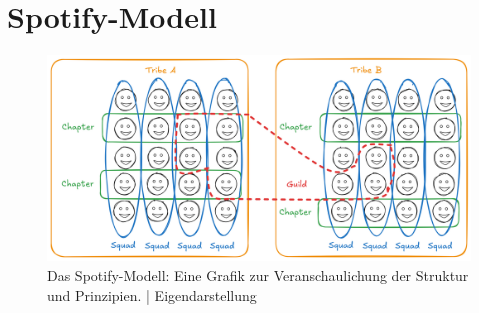 \cleardoublepage
\section{Spotify-Modell}
\label{sec:Spoitfy}

\begin{figure}[H]
    \centering %
    \includegraphics[width=\textwidth]{images/spot} %
    \caption{Das Spotify-Modell: Eine Grafik zur Veranschaulichung der Struktur und Prinzipien. | Eigendarstellung}
    \label{fig:spotify_model} %
\end{figure}


